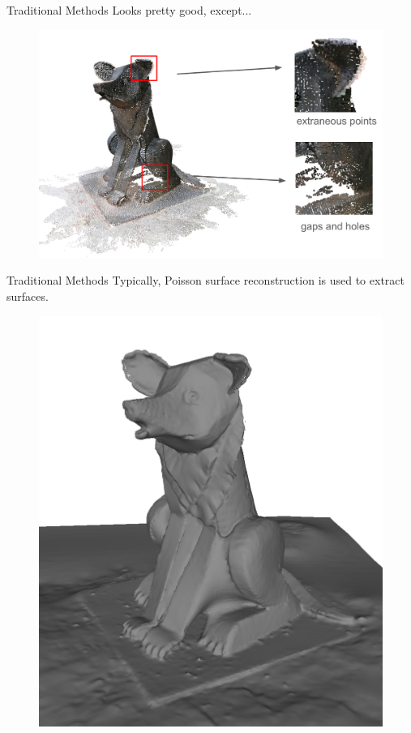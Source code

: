 \documentclass[10pt]{beamer}
\begin{document}
\begin{frame}{Traditional Methods}
    Looks pretty good, except...

    \begin{figure}
        \centering
        \includegraphics[width=0.8\linewidth]{figures/intro/issues.png}
    \end{figure}
\end{frame}

\begin{frame}{Traditional Methods}
    Typically, \alert{Poisson surface reconstruction} \citep{kazhdan2006poisson} is used to extract surfaces.

    \begin{figure}
        \centering
        \includegraphics[width=0.5\linewidth]{figures/intro/psr.png}
    \end{figure}
\end{frame}
\end{document}
